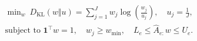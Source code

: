 \documentclass[border=3pt]{standalone}
\begin{document}
$\displaystyle
\begin{gathered}
\min_{w}\ D_{\mathrm{KL}}(w\Vert u)=\sum_{j=1}^{J}w_j\log\!\left(\frac{w_j}{u_j}\right),\quad u_j=\frac1J,\\[3pt]
\text{subject to }\mathbf1^\top w=1,\quad w_j\geq w_{\min},\quad L_e\leq \widehat A_{e:}w\leq U_e.
\end{gathered}$
\end{document}
